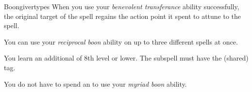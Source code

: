 \begin{feat}{Boongiver}{types}
         When you use your \textit{benevolent transferance} ability successfully, the original target of the spell regains the action point it spent to attune to the spell.

         You can use your \textit{reciprocal boon} ability on up to three different spells at once.

         You learn an additional  of 8th level or lower.
        The subspell must have the  (shared) tag.

         You do not have to spend an  to use your \textit{myriad boon} ability.

    \end{feat}

